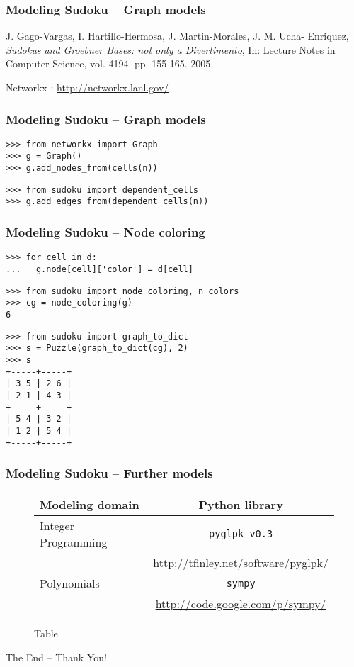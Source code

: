 \documentclass{beamer}
\begin{document}
\begin{frame}[fragile]
\frametitle{Modeling Sudoku -- Graph models}
J. Gago-Vargas, I. Hartillo-Hermosa, J. Martin-Morales, J. M. Ucha- Enriquez, \emph{Sudokus and Groebner Bases: not only a Divertimento}, In: Lecture Notes in Computer Science, vol. 4194. pp. 155-165. 2005

Networkx : \url{http://networkx.lanl.gov/}
\end{frame}


\begin{frame}[fragile]
\frametitle{Modeling Sudoku -- Graph models}
\begin{lstlisting}
>>> from networkx import Graph
>>> g = Graph()
>>> g.add_nodes_from(cells(n))
\end{lstlisting}

\pause

\begin{lstlisting}
>>> from sudoku import dependent_cells
>>> g.add_edges_from(dependent_cells(n))
\end{lstlisting}
\end{frame}

\begin{frame}[fragile]
\frametitle{Modeling Sudoku -- Node coloring}
\begin{lstlisting}
>>> for cell in d:
...   g.node[cell]['color'] = d[cell]
\end{lstlisting}

\pause

\begin{lstlisting}
>>> from sudoku import node_coloring, n_colors
>>> cg = node_coloring(g)
6
\end{lstlisting}

\pause

\begin{lstlisting}
>>> from sudoku import graph_to_dict
>>> s = Puzzle(graph_to_dict(cg), 2)
>>> s
+-----+-----+
| 3 5 | 2 6 | 
| 2 1 | 4 3 | 
+-----+-----+
| 5 4 | 3 2 | 
| 1 2 | 5 4 | 
+-----+-----+
\end{lstlisting}

\pause
\end{frame}



\begin{frame}[fragile]
\frametitle{Modeling Sudoku -- Further models}
 \begin{figure}[h]
  \centering
  \begin{tabular}{ l c }
  Modeling domain    & Python library \\ \hline
  Integer Programming & \texttt{pyglpk v0.3} \\
                     & \url{http://tfinley.net/software/pyglpk/} \\
  Polynomials        & \texttt{sympy} \\
                     & \url{http://code.google.com/p/sympy/}
  \end{tabular}
  \caption{Table}
 \end{figure} 
\end{frame}

\begin{frame}
  The End -- Thank You!
\end{frame}
\end{document}
